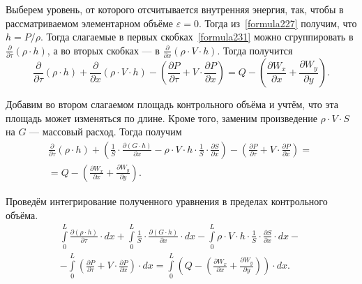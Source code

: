 Выберем уровень, от которого отсчитывается внутренняя энергия, так, чтобы в рассматриваемом элементарном объёме $\varepsilon=0$. Тогда из~\eqref{formula227} получим, что $h=P/{\rho}$. Тогда слагаемые в первых скобках~\eqref{formula231} можно сгруппировать в $\frac{\partial}{\partial\tau}\left(\rho\cdot h\right)$, а во вторых скобках --- в $\frac{\partial}{\partial x}\left(\rho\cdot V \cdot h \right)$. Тогда получится
\begin{equation}
\label{formula232}
\frac{\partial}{\partial\tau}\left(\rho\cdot h\right)+\frac{\partial}{\partial x}\left(\rho\cdot V \cdot h \right) - \left(\frac{\partial P}{\partial\tau}+V\cdot\frac{\partial P}{\partial x} \right) = Q - \left(\frac{\partial W_x}{\partial x} + \frac{\partial W_y}{\partial y} \right). 
\end{equation}

Добавим во втором слагаемом площадь контрольного объёма и учтём, что эта площадь может изменяться по длине. Кроме того, заменим произведение $\rho \cdot V \cdot S$ на $G$ --- массовый расход. Тогда получим
\begin{eqnarray}
\label{formula233}
\frac{\partial}{\partial\tau}\left(\rho\cdot h\right)+\left(\frac 1 S \cdot \frac{\partial(G \cdot h)}{\partial x} - \rho\cdot V \cdot h \cdot \frac 1 S \cdot \frac{\partial S}{\partial x} \right) - \left(\frac{\partial P}{\partial\tau}+V\cdot\frac{\partial P}{\partial x} \right) = \nonumber ~\\
= Q - \left(\frac{\partial W_x}{\partial x} + \frac{\partial W_y}{\partial y} \right). 
\end{eqnarray}

Проведём интегрирование полученного уравнения в пределах контрольного объёма. 
\begin{eqnarray}
\label{formula234}
\int\limits_{0}^{L}\frac{\partial(\rho\cdot h)}{\partial\tau} \cdot dx + \int\limits_{0}^{L} \frac 1 S \cdot \frac{\partial(G \cdot h)}{\partial x} \cdot dx - \int\limits_{0}^{L} \rho\cdot V \cdot h \cdot \frac 1 S \cdot \frac{\partial S}{\partial x} \cdot dx - \nonumber ~\\
- \int\limits_{0}^{L} \left(\frac{\partial P}{\partial\tau}+V\cdot\frac{\partial P}{\partial x} \right) \cdot dx = \int\limits_{0}^{L} \left( Q - \left(\frac{\partial W_x}{\partial x} + \frac{\partial W_y}{\partial y} \right) \right) \cdot dx. 
\end{eqnarray}

